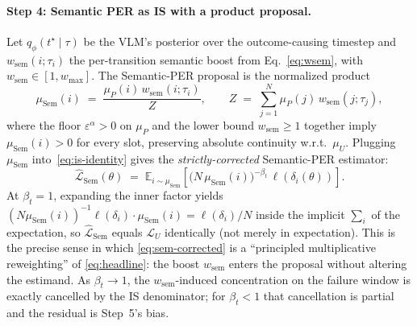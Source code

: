 \paragraph{Step 4: Semantic PER as IS with a product proposal.}
Let $q_\phi(t^\star\!\mid\!\tau)$ be the VLM's posterior over the
outcome-causing timestep and $w_{\text{sem}}(i;\tau_i)$ the
per-transition semantic boost from Eq.~\eqref{eq:wsem}, with
$w_{\text{sem}}\!\in\![1,w_{\max}]$. The Semantic-PER proposal is the
normalized product
\begin{equation}
\mu_{\text{Sem}}(i) \;=\; \frac{\mu_P(i)\,w_{\text{sem}}(i;\tau_i)}{Z},
\qquad
Z \;=\; \sum_{j=1}^{N} \mu_P(j)\,w_{\text{sem}}(j;\tau_j),
\label{eq:sem-prop}
\end{equation}
where the floor $\varepsilon^\alpha\!>\!0$ on $\mu_P$ and the lower bound
$w_{\text{sem}}\!\ge\!1$ together imply $\mu_{\text{Sem}}(i)\!>\!0$ for
every slot, preserving absolute continuity w.r.t.\ $\mu_U$. Plugging
$\mu_{\text{Sem}}$ into~\eqref{eq:is-identity} gives the
\emph{strictly-corrected} Semantic-PER estimator:
\begin{equation}
\widehat{\mathcal{L}}_{\text{Sem}}(\theta) \;=\; \mathbb{E}_{i\sim\mu_{\text{Sem}}}\!\left[
\bigl(N\,\mu_{\text{Sem}}(i)\bigr)^{-\beta_t}\,\ell(\delta_i(\theta))\right].
\label{eq:sem-corrected}
\end{equation}
At $\beta_t\!=\!1$, expanding the inner factor yields
$(N\mu_{\text{Sem}}(i))^{-1}\ell(\delta_i) \cdot \mu_{\text{Sem}}(i)
=\ell(\delta_i)/N$ inside the implicit $\sum_i$ of the expectation,
so $\widehat{\mathcal{L}}_{\text{Sem}}$ equals $\mathcal{L}_U$ identically
(not merely in expectation). This is the precise sense in which
\eqref{eq:sem-corrected} is a ``principled multiplicative reweighting''
of \eqref{eq:headline}: the boost $w_{\text{sem}}$ enters the proposal
without altering the estimand. As $\beta_t\!\to\!1$, the
$w_{\text{sem}}$-induced concentration on the failure window is
exactly cancelled by the IS denominator; for $\beta_t\!<\!1$ that
cancellation is partial and the residual is Step~5's bias.

